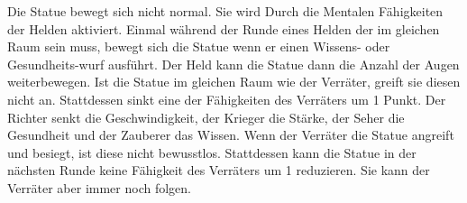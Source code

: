   \begin{itemize}
        \bitem Die Statue bewegt sich nicht normal. Sie wird Durch die Mentalen Fähigkeiten der Helden aktiviert. Einmal während der Runde eines Helden der im gleichen Raum sein muss, bewegt sich die Statue wenn er einen Wissens- oder Gesundheits-wurf ausführt.
      Der Held kann die Statue dann die Anzahl der Augen weiterbewegen.
        \bitem Ist die Statue im gleichen Raum wie der Verräter, greift sie diesen nicht an. Stattdessen sinkt eine der Fähigkeiten des Verräters um 1 Punkt. Der Richter senkt die Geschwindigkeit, der Krieger die Stärke, der Seher die Gesundheit und der Zauberer das Wissen.
        \bitem Wenn der Verräter die Statue angreift und besiegt, ist diese nicht bewusstlos. Stattdessen kann die Statue in der nächsten Runde keine Fähigkeit des Verräters um 1 reduzieren. Sie kann der Verräter aber immer noch folgen.
    \end{itemize}

